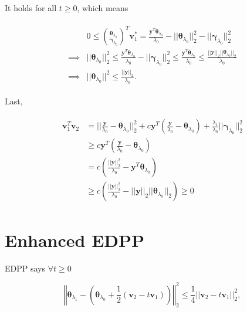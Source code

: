 It holds for all $t\geq 0$, which means

\begin{gather}
    \begin{aligned}
        &0\leq\binom{\boldsymbol\theta_{\lambda_0}}{\boldsymbol\gamma_{\lambda_0}}^T\boldsymbol v_1^*=\frac{\boldsymbol y^T\boldsymbol\theta_{\lambda_0}}{\lambda_0}-||\boldsymbol\theta_{\lambda_0}||_2^2-||\boldsymbol\gamma_{\lambda_0}||_2^2\\
        \implies&||\boldsymbol\theta_{\lambda_0}||^2_2\leq\frac{\boldsymbol y^T\boldsymbol\theta_{\lambda_0}}{\lambda_0}-||\boldsymbol\gamma_{\lambda_0}||_2^2\leq\frac{\boldsymbol y^T\boldsymbol\theta_{\lambda_0}}{\lambda_0}\leq \frac{||\boldsymbol y||_2||\boldsymbol\theta_{\lambda_0}||_2}{\lambda_0}\\
        \implies&||\boldsymbol\theta_{\lambda_0}||^2\leq\frac{||\boldsymbol y||_2}{\lambda_0}.
    \end{aligned}
\end{gather}

Last,

\begin{gather}
    \begin{aligned}
        \boldsymbol v_1^T\boldsymbol v_2&=||\frac{\boldsymbol y}{\lambda_0}-\boldsymbol\theta_{\lambda_0}||_2^2+c\boldsymbol y^T(\frac{\boldsymbol y}{\lambda_0}-\boldsymbol\theta_{\lambda_0})+\frac{\lambda_1}{\lambda_0}||\boldsymbol\gamma_{\lambda_0}||_2^2\\
        &\geq c\boldsymbol y^T(\frac{\boldsymbol y}{\lambda_0}-\boldsymbol\theta_{\lambda_0})\\
        &=c\left(\frac{||\boldsymbol y||_2^2}{\lambda_0}-\boldsymbol y^T\boldsymbol\theta_{\lambda_0}\right)\\
        &\geq c\left(\frac{||\boldsymbol y||_2^2}{\lambda_0}-||\boldsymbol y||_2||\boldsymbol\theta_{\lambda_0}||_2\right)\geq 0
    \end{aligned}
\end{gather}
\fi

\section{Enhanced EDPP}

EDPP says $\forall t\geq 0$

\begin{equation}
    \left\Vert\boldsymbol\theta_{\lambda_1}-\left(\boldsymbol\theta_{\lambda_0}+\frac{1}{2}(\boldsymbol v_2-t\boldsymbol v_1)\right)\right\Vert_2^2\leq\frac{1}{4}||\boldsymbol v_2-t\boldsymbol v_1||_2^2,
\end{equation}

